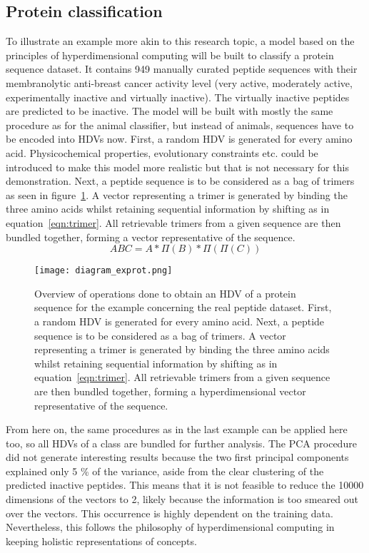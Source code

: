 \subsection*{Protein classification}
\label{ssec:protclas}
To illustrate an example more akin to this research topic, a model based on the principles of hyperdimensional computing will be built to classify a protein sequence dataset\cite{anticancer}. It contains 949 manually curated peptide sequences with their membranolytic anti-breast cancer activity level (very active, moderately active, experimentally inactive and virtually inactive). The virtually inactive peptides are predicted to be inactive. The model will be built with mostly the same procedure as for the animal classifier, but instead of animals, sequences have to be encoded into HDVs now. First, a random HDV is generated for every amino acid. Physicochemical properties, evolutionary constraints etc. could be introduced to make this model more realistic but that is not necessary for this demonstration. Next, a peptide sequence is to be considered as a bag of trimers as seen in figure~\ref{fig:diagram_exprot}. A vector representing a trimer is generated by binding the three amino acids whilst retaining sequential information by shifting as in equation~\ref{eqn:trimer}. All retrievable trimers from a given sequence are then bundled together, forming a vector representative of the sequence. 
\begin{equation}\label{eqn:trimer}
    ABC = A * \Pi (B) * \Pi (\Pi (C))
\end{equation}
\begin{figure}[h]
    \centering
    \texttt{[image: diagram\_exprot.png]}
    \caption{Overview of operations done to obtain an HDV of a protein sequence for the example concerning the real peptide dataset. First, a random HDV is generated for every amino acid. Next, a peptide sequence is to be considered as a bag of trimers. A vector representing a trimer is generated by binding the three amino acids whilst retaining sequential information by shifting as in equation~\ref{eqn:trimer}. All retrievable trimers from a given sequence are then bundled together, forming a hyperdimensional vector representative of the sequence.}
    \label{fig:diagram_exprot}
\end{figure}
From here on, the same procedures as in the last example can be applied here too, so all HDVs of a class are bundled for further analysis. The PCA procedure did not generate interesting results because the two first principal components explained only 5 \% of the variance, aside from the clear clustering of the predicted inactive peptides. This means that it is not feasible to reduce the 10000 dimensions of the vectors to 2, likely because the information is too smeared out over the vectors. This occurrence is highly dependent on the training data. Nevertheless, this follows the philosophy of hyperdimensional computing in keeping holistic representations of concepts.

